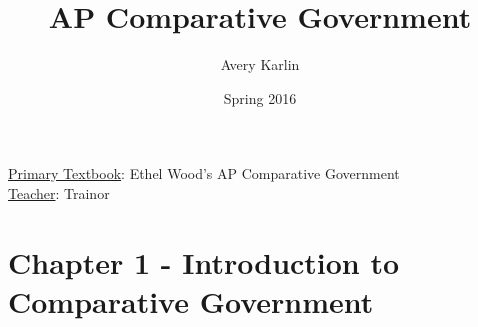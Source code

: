 \documentclass[11 pt, twoside]{article}
\begin{document}
\title{AP Comparative Government}
\author{Avery Karlin}
\date{Spring 2016}
\newcommand{\textbook}{Ethel Wood's AP Comparative Government}
\newcommand{\teacher}{Trainor}

\maketitle
\newpage
\hypertarget{content}{\tableofcontents}
\vspace{11pt}
\noindent
\underline{Primary Textbook}: \textbook\\
\underline{Teacher}: \teacher
\newpage

\section{Chapter 1 - Introduction to Comparative Government}
\end{document}
